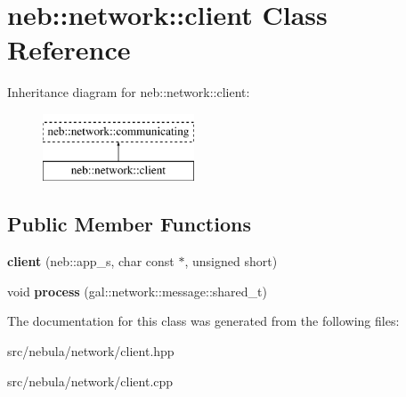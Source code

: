 \hypertarget{classneb_1_1network_1_1client}{\section{neb\-:\-:network\-:\-:client \-Class \-Reference}
\label{classneb_1_1network_1_1client}
}
\-Inheritance diagram for neb\-:\-:network\-:\-:client\-:\begin{figure}[H]
\begin{center}
\leavevmode
\includegraphics[height=2.000000cm]{classneb_1_1network_1_1client}
\end{center}
\end{figure}
\subsection*{\-Public \-Member \-Functions}
\begin{DoxyCompactItemize}
\item 
\hypertarget{classneb_1_1network_1_1client_a4f117f86f1d548c492645b47ca3b1fb0}{{\bfseries client} (neb\-::app\-\_\-s, char const $\ast$, unsigned short)}\label{classneb_1_1network_1_1client_a4f117f86f1d548c492645b47ca3b1fb0}

\item 
\hypertarget{classneb_1_1network_1_1client_a04d1cdc645678b66a0c0bdfcf9eb3c1d}{void {\bfseries process} (gal\-::network\-::message\-::shared\-\_\-t)}\label{classneb_1_1network_1_1client_a04d1cdc645678b66a0c0bdfcf9eb3c1d}

\end{DoxyCompactItemize}


\-The documentation for this class was generated from the following files\-:\begin{DoxyCompactItemize}
\item 
src/nebula/network/client.\-hpp\item 
src/nebula/network/client.\-cpp\end{DoxyCompactItemize}
